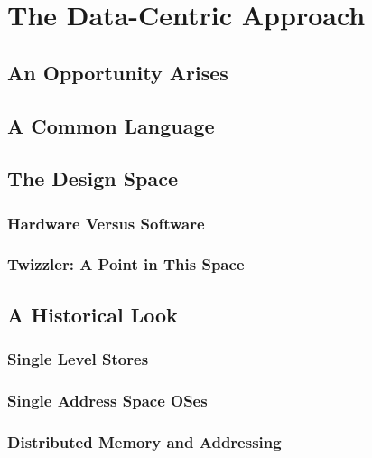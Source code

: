 
\chapter{The Data-Centric Approach}\label{ch:datacentric}

\section{An Opportunity Arises}

\section{A Common Language}

\section{The Design Space}

\subsection{Hardware Versus Software}

\subsection{Twizzler: A Point in This Space}

\section{A Historical Look}

\subsection{Single Level Stores}

\subsection{Single Address Space OSes}

\subsection{Distributed Memory and Addressing}